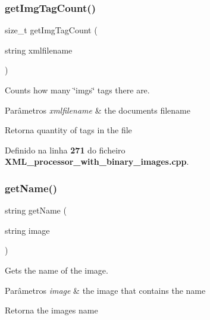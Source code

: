 \subsubsection{get\+Img\+Tag\+Count()}
{\footnotesize\ttfamily size\+\_\+t get\+Img\+Tag\+Count (\begin{DoxyParamCaption}\item[{string}]{xmlfilename }\end{DoxyParamCaption})}



Counts how many \char`\"{}imgs\char`\"{} tags there are. 


\begin{DoxyParams}{Parâmetros}
{\em xmlfilename} & the document\textquotesingle{}s filename \\
\hline
\end{DoxyParams}
\begin{DoxyReturn}{Retorna}
quantity of tags in the file 
\end{DoxyReturn}


Definido na linha \textbf{ 271} do ficheiro \textbf{ X\+M\+L\+\_\+processor\+\_\+with\+\_\+binary\+\_\+images.\+cpp}.

\mbox{\label{_x_m_l__processor__with__binary__images_8cpp_a0a4f54b1a5414a00e2e44d3125a5e582}} 
\subsubsection{get\+Name()}
{\footnotesize\ttfamily string get\+Name (\begin{DoxyParamCaption}\item[{string}]{image }\end{DoxyParamCaption})}



Gets the name of the image. 


\begin{DoxyParams}{Parâmetros}
{\em image} & the image that contains the name \\
\hline
\end{DoxyParams}
\begin{DoxyReturn}{Retorna}
the image\textquotesingle{}s name 
\end{DoxyReturn}


